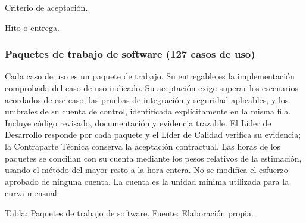 \documentclass[11pt]{article}
\begin{document}
Criterio de aceptación.

Hito o entrega.

\subsubsection{Paquetes de trabajo de software (127 casos de uso)}

Cada caso de uso es un paquete de trabajo. Su entregable es la implementación comprobada del caso de uso indicado. Su aceptación exige superar los escenarios acordados de ese caso, las pruebas de integración y seguridad aplicables, y los umbrales de su cuenta de control, identificada explícitamente en la misma fila. Incluye código revisado, documentación y evidencia trazable. El Líder de Desarrollo responde por cada paquete y el Líder de Calidad verifica su evidencia; la Contraparte Técnica conserva la aceptación contractual. Las horas de los paquetes se concilian con su cuenta mediante los pesos relativos de la estimación, usando el método del mayor resto a la hora entera. No se modifica el esfuerzo aprobado de ninguna cuenta. La cuenta es la unidad mínima utilizada para la curva mensual.

Tabla: Paquetes de trabajo de software. Fuente: Elaboración propia.
\end{document}
